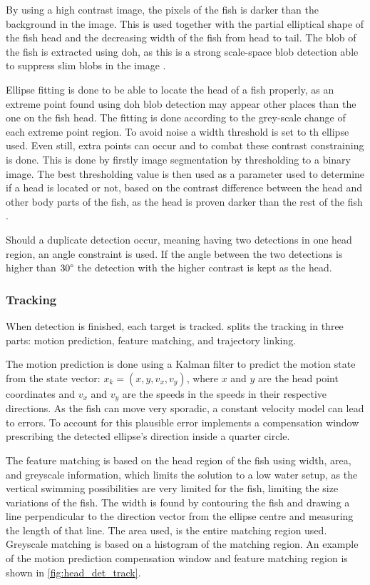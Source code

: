 By using a high contrast image, the pixels of the fish is darker than the background in the image. This is used together with the partial elliptical shape of the fish head and the decreasing width of the fish from head to tail. The blob of the fish is extracted using \gls{doh}, as this is a strong scale-space blob detection able to suppress slim blobs in the image \citep{Qian2014}.

Ellipse fitting is done to be able to locate the head of a fish properly, as an extreme point found using \gls{doh} blob detection may appear other places than the one on the fish head. The fitting is done according to the grey-scale change of each extreme point region. To avoid noise a width threshold is set to th ellipse used. Even still, extra points can occur and to combat these contrast constraining is done. This is done by firstly image segmentation by thresholding to a binary image. The best thresholding value is then used as a parameter used to determine if a head is located or not, based on the contrast difference between the head and other body parts of the fish, as the head is proven darker than the rest of the fish \citep{Qian2014}.

Should a duplicate detection occur, meaning having two detections in one head region, an angle constraint is used. If the angle between the two detections is higher than $30 \degree$ the detection with the higher contrast is kept as the head.

\subsubsection{Tracking}
When detection is finished, each target is tracked. \cite{Qian2014} splits the tracking in three parts: motion prediction, feature matching, and trajectory linking.

The motion prediction is done using a Kalman filter to predict the motion state from the state vector: $ x_k = (x,y,v_x,v_y) $, where $x$ and $y$ are the head point coordinates and $v_x$ and $ v_y $ are the speeds in the speeds in their respective directions. As the fish can move very sporadic, a constant velocity model can lead to errors. To account for this plausible error \cite{Qian2014} implements a compensation window prescribing the detected ellipse's direction inside a quarter circle.

The feature matching is based on the head region of the fish using width, area, and greyscale information, which limits the solution to a low water setup, as the vertical swimming possibilities are very limited for the fish, limiting the size variations of the fish. The width is found by contouring the fish and drawing a line perpendicular to the direction vector from the ellipse centre and measuring the length of that line. The area used, is the entire matching region used. Greyscale matching is based on a histogram of the matching region. An example of the motion prediction compensation window and feature matching region is shown in \autoref{fig:head_det_track}.


